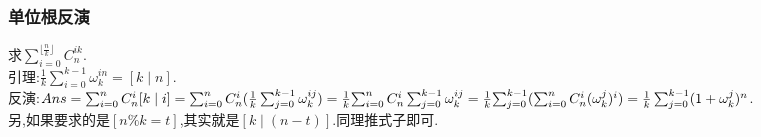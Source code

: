 \subsubsection{单位根反演}
求$\sum_{i=0}^{\lfloor \frac{n}{k} \rfloor} {C_n^{ik}}$.\\
引理:$\frac{1}{k} \sum_{i=0}^{k-1} \omega_{k}^{in} = [k \mid n]$.\\
反演:$Ans = \sum_{i=0}^n{C_n^i [k \mid i]} \\= \sum_{i=0}^n{C_n^i(\frac{1}{k}\sum_{j=0}^{k-1}{\omega_k^{ij}})} \\= \frac{1}{k} {\sum_{i=0}^{n}C_n^i \sum_{j=0}^{k-1} \omega_k^{ij}} \\= \frac{1}{k} {\sum_{j=0}^{k-1}(\sum_{i=0}^n C_n^i(\omega_k^j)^i)} \\= \frac{1}{k} \sum_{j=0}^{k-1} (1+\omega_k^j)^n$.\\
另,如果要求的是$[n \% k = t]$,其实就是$[k \mid (n-t)]$.同理推式子即可.